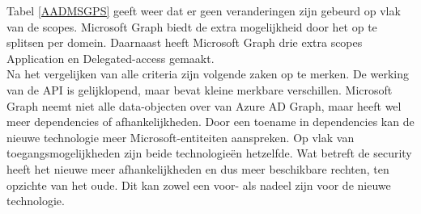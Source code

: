 Tabel \ref{AADMSGPS} geeft weer dat er geen veranderingen zijn gebeurd op vlak van de scopes. Microsoft Graph biedt de extra mogelijkheid door het op te splitsen per domein. Daarnaast heeft Microsoft Graph drie extra scopes Application en Delegated-access gemaakt. \\

Na het vergelijken van alle criteria zijn volgende zaken op te merken. De werking van de \Ac{API} is gelijklopend, maar bevat kleine merkbare verschillen. Microsoft Graph neemt niet alle data-objecten over van Azure \ac{AD} Graph, maar heeft wel meer dependencies of afhankelijkheden. Door een toename in dependencies kan de nieuwe technologie meer Microsoft-entiteiten aanspreken. Op vlak van toegangsmogelijkheden zijn beide technologieën hetzelfde. Wat betreft de security heeft het nieuwe meer afhankelijkheden en dus meer beschikbare rechten, ten opzichte van het oude. Dit kan zowel een voor- als nadeel zijn voor de nieuwe technologie.
